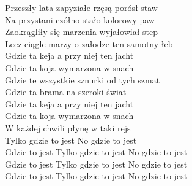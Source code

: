 Przeszły lata zapyziałe rzęsą porósł staw \\
Na przystani czółno stało kolorowy paw \\
Zaokrągliły się marzenia wyjałowiał step \\
Lecz ciągle marzy o załodze ten samotny łeb \\


Gdzie ta keja a przy niej ten jacht \\
Gdzie ta koja wymarzona w snach \\
Gdzie te wszystkie sznurki od tych szmat \\
Gdzie ta brama na szeroki świat \\
Gdzie ta keja a przy niej ten jacht \\
Gdzie ta koja wymarzona w snach \\
W każdej chwili płynę w taki rejs \\
Tylko gdzie to jest No gdzie to jest \\
Gdzie to jest Tylko gdzie to jest No gdzie to jest \\
Gdzie to jest Tylko gdzie to jest No gdzie to jest \\
Gdzie to jest Tylko gdzie to jest No gdzie to jest \\
